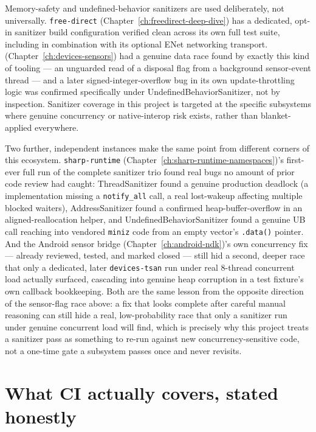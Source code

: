Memory-safety and undefined-behavior sanitizers are used deliberately, not universally.
\texttt{free-direct} (Chapter~\ref{ch:freedirect-deep-dive}) has a dedicated, opt-in sanitizer
build configuration verified clean across its own full test suite, including in combination
with its optional ENet networking transport. 
(Chapter~\ref{ch:devices-sensors}) had a genuine data race found by exactly this kind of
tooling --- an unguarded read of a disposal flag from a background sensor-event thread --- and
a later signed-integer-overflow bug in its own update-throttling logic was confirmed
specifically under UndefinedBehaviorSanitizer, not by inspection. Sanitizer coverage in this
project is targeted at the specific subsystems where genuine concurrency or native-interop
risk exists, rather than blanket-applied everywhere.

Two further, independent instances make the same point from different corners of this
ecosystem. \texttt{sharp-runtime} (Chapter~\ref{ch:sharp-runtime-namespaces})'s first-ever full
run of the complete sanitizer trio found real bugs no amount of prior code review had caught:
ThreadSanitizer found a genuine production deadlock (a  implementation
missing a \texttt{notify\_all} call, a real lost-wakeup affecting multiple blocked waiters),
AddressSanitizer found a confirmed heap-buffer-overflow in an aligned-reallocation helper, and
UndefinedBehaviorSanitizer found a genuine UB call reaching into vendored \texttt{miniz} code
from an empty vector's \texttt{.data()} pointer. And the Android sensor bridge
(Chapter~\ref{ch:android-ndk})'s own concurrency fix --- already reviewed, tested, and marked
closed --- still hid a second, deeper race that only a dedicated, later \texttt{devices-tsan}
run under real 8-thread concurrent load actually surfaced, cascading into genuine heap
corruption in a test fixture's own callback bookkeeping. Both are the same lesson from the
opposite direction of the sensor-flag race above: a fix that looks complete after careful
manual reasoning can still hide a real, low-probability race that only a sanitizer run under
genuine concurrent load will find, which is precisely why this project treats a sanitizer pass
as something to re-run against new concurrency-sensitive code, not a one-time gate a subsystem
passes once and never revisits.

\section{What CI actually covers, stated honestly}

